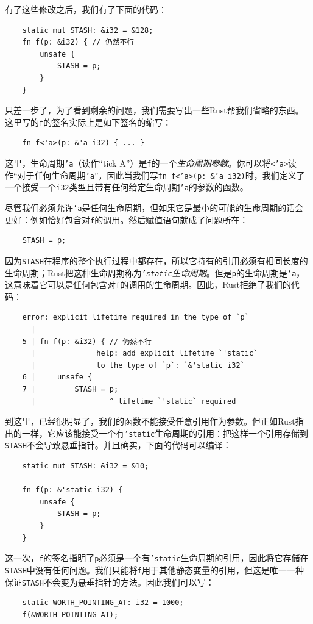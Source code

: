 有了这些修改之后，我们有了下面的代码：
\begin{verbatim}
    static mut STASH: &i32 = &128;
    fn f(p: &i32) { // 仍然不行
        unsafe {
            STASH = p;
        }
    }
\end{verbatim}

只差一步了，为了看到剩余的问题，我们需要写出一些Rust帮我们省略的东西。这里写的\texttt{f}的签名实际上是如下签名的缩写：
\begin{verbatim}
    fn f<'a>(p: &'a i32) { ... }
\end{verbatim}

这里，生命周期\texttt{'a}（读作“tick A”）是\texttt{f}的一个\emph{生命周期参数}。你可以将\texttt{<'a>}读作“对于任何生命周期\texttt{'a}”，因此当我们写\texttt{fn f<'a>(p: \&'a i32)}时，我们定义了一个接受一个\texttt{i32}类型且带有任何给定生命周期\texttt{'a}的参数的函数。

尽管我们必须允许\texttt{'a}是任何生命周期，但如果它是最小的可能的生命周期的话会更好：例如恰好包含对\texttt{f}的调用。然后赋值语句就成了问题所在：
\begin{verbatim}
    STASH = p;
\end{verbatim}

因为\texttt{STASH}在程序的整个执行过程中都存在，所以它持有的引用必须有相同长度的生命周期；Rust把这种生命周期称为\emph{\texttt{'static}生命周期}。但是\texttt{p}的生命周期是\texttt{'a}，这意味着它可以是任何包含对\texttt{f}的调用的生命周期。因此，Rust拒绝了我们的代码：
\begin{verbatim}
    error: explicit lifetime required in the type of `p`
      |
    5 | fn f(p: &i32) { // 仍然不行
      |         ____ help: add explicit lifetime `'static`
      |              to the type of `p`: `&'static i32`
    6 |     unsafe {
    7 |         STASH = p;
      |                 ^ lifetime `'static` required
\end{verbatim}

到这里，已经很明显了，我们的函数不能接受任意引用作为参数。但正如Rust指出的一样，它应该能接受一个有\texttt{'static}生命周期的引用：把这样一个引用存储到\texttt{STASH}不会导致悬垂指针。并且确实，下面的代码可以编译：
\begin{verbatim}
    static mut STASH: &i32 = &10;

    fn f(p: &'static i32) {
        unsafe {
            STASH = p;
        }
    }
\end{verbatim}

这一次，\texttt{f}的签名指明了\texttt{p}必须是一个有\texttt{'static}生命周期的引用，因此将它存储在\texttt{STASH}中没有任何问题。我们只能将\texttt{f}用于其他静态变量的引用，但这是唯一一种保证\texttt{STASH}不会变为悬垂指针的方法。因此我们可以写：
\begin{verbatim}
    static WORTH_POINTING_AT: i32 = 1000;
    f(&WORTH_POINTING_AT);
\end{verbatim}

